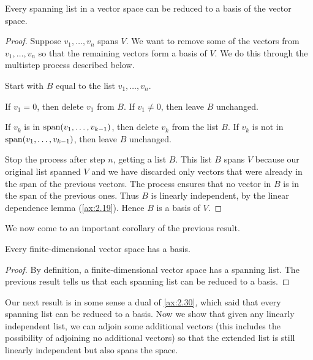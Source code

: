 \begin{result}\label{ax:2.30}
Every spanning list in a vector space can be reduced to a basis of the vector
space.
\end{result}

\begin{proof}
Suppose $v_1,\dots,v_n$ spans $V$. We want to remove some of the vectors from
$v_1,\dots,v_n$ so that the remaining vectors form a basis of $V$. We do this
through the multistep process described below.

Start with $B$ equal to the list $v_1,\dots,v_n$.
\begin{description}[style=nextline,leftmargin=1em,itemsep=2pt,parsep=3pt]
\item[Step 1] If $v_1=0$, then delete $v_1$ from $B$. If $v_1\ne0$, then leave
  $B$ unchanged.
\item[Step $\bm{k}$] If $v_k$ is in $\operatorname{span}(v_1,\dots,v_{k-1})$, then
  delete $v_k$ from the list $B$. If $v_k$ is not in $\operatorname{span}(v_1,\dots,v_{k-1})$,
  then leave $B$ unchanged.
\end{description}
Stop the process after step $n$, getting a list $B$. This list $B$ spans $V$
because our original list spanned $V$ and we have discarded only vectors that
were already in the span of the previous vectors. The process ensures that no
vector in $B$ is in the span of the previous ones. Thus $B$ is linearly
independent, by the linear dependence lemma (\ref{ax:2.19}). Hence $B$ is a
basis of $V$.
\end{proof}

We now come to an important corollary of the previous result.

\begin{result}\label{ax:2.31}
Every finite-dimensional vector space has a basis.
\end{result}

\begin{proof}
By definition, a finite-dimensional vector space has a spanning list. The
previous result tells us that each spanning list can be reduced to a basis.
\end{proof}

Our next result is in some sense a dual of \ref{ax:2.30}, which said that every
spanning list can be reduced to a basis. Now we show that given any linearly
independent list, we can adjoin some additional vectors (this includes the
possibility of adjoining no additional vectors) so that the extended list is
still linearly independent but also spans the space.

